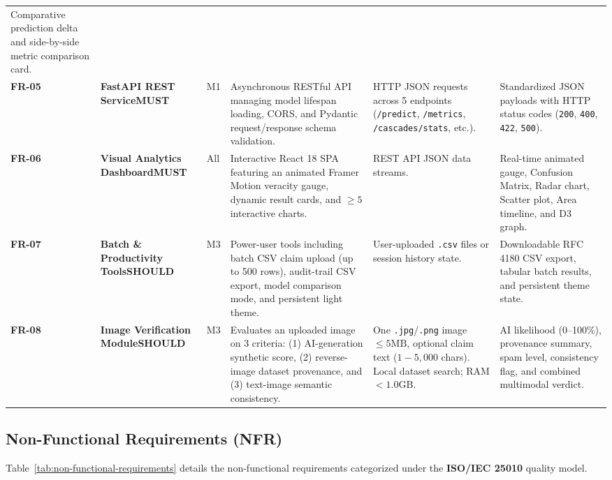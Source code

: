 \documentclass[11pt, a4paper]{article}
\newcommand{\badgeMust}{\colorbox{mustRedBg}{\textcolor{mustRedText}{\scriptsize\textsf{\textbf{MUST}}}}}
\newcommand{\badgeShould}{\colorbox{shouldAmberBg}{\textcolor{shouldAmberText}{\scriptsize\textsf{\textbf{SHOULD}}}}}
\newcommand{\code}[1]{\texttt{\small #1}}
\begin{document}
\begin{table}[H]
\begin{tabularx}{\textwidth}{@{}C{1.1cm} L{2.2cm} C{0.8cm} Y L{3.1cm} L{2.8cm}@{}}
    Comparative prediction delta and side-by-side metric comparison card. \\
    \textbf{FR-05} & \textbf{FastAPI REST Service}\newline\badgeMust & M1 &
    Asynchronous RESTful API managing model lifespan loading, CORS, and Pydantic request/response schema validation. &
    HTTP JSON requests across 5 endpoints (\code{/predict}, \code{/metrics}, \code{/cascades/stats}, etc.). &
    Standardized JSON payloads with HTTP status codes (\code{200}, \code{400}, \code{422}, \code{500}). \\
    \textbf{FR-06} & \textbf{Visual Analytics Dashboard}\newline\badgeMust & All &
    Interactive React 18 SPA featuring an animated Framer Motion veracity gauge, dynamic result cards, and $\ge 5$ interactive charts. &
    REST API JSON data streams. &
    Real-time animated gauge, Confusion Matrix, Radar chart, Scatter plot, Area timeline, and D3 graph. \\
    \textbf{FR-07} & \textbf{Batch \& Productivity Tools}\newline\badgeShould & M3 &
    Power-user tools including batch CSV claim upload (up to 500 rows), audit-trail CSV export, model comparison mode, and persistent light theme. &
    User-uploaded \code{.csv} files or session history state. &
    Downloadable RFC 4180 CSV export, tabular batch results, and persistent theme state. \\
    \textbf{FR-08} & \textbf{Image Verification Module}\newline\badgeShould & M3 &
    Evaluates an uploaded image on 3 criteria: (1) AI-generation synthetic score, (2) reverse-image dataset provenance, and (3) text-image semantic consistency. &
    One \code{.jpg}/\code{.png} image $\le 5\text{MB}$, optional claim text ($1-5,000$ chars). Local dataset search; RAM $< 1.0\text{GB}$. &
    AI likelihood (0--100\%), provenance summary, spam level, consistency flag, and combined multimodal verdict. \\
    \bottomrule
  \end{tabularx}
\end{table}

\subsection{Non-Functional Requirements (NFR)}
Table~\ref{tab:non-functional-requirements} details the non-functional requirements categorized under the \textbf{ISO/IEC 25010} quality model.
\end{document}
